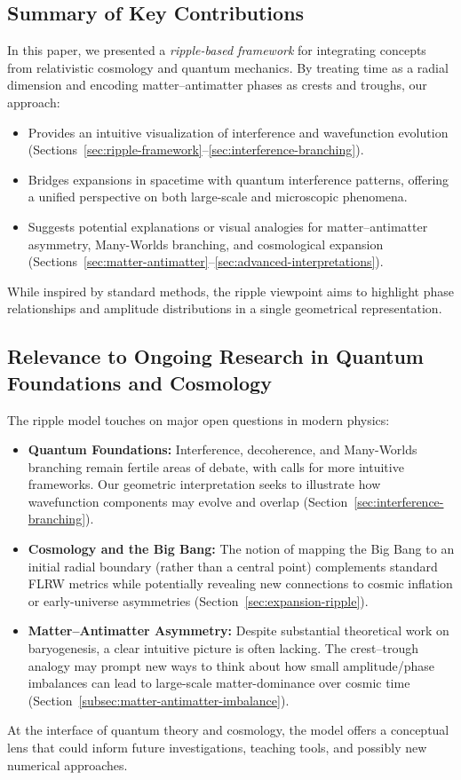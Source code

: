 \documentclass[11pt]{article}
\begin{document}
\subsection{Summary of Key Contributions}
\label{subsec:summary-contributions}
In this paper, we presented a \emph{ripple-based framework} for integrating 
concepts from relativistic cosmology and quantum mechanics. By treating 
time as a radial dimension and encoding matter--antimatter phases as 
crests and troughs, our approach:
\begin{itemize}
  \item Provides an intuitive visualization of interference and wavefunction 
        evolution (Sections~\ref{sec:ripple-framework}--\ref{sec:interference-branching}).
  \item Bridges expansions in spacetime with quantum interference patterns, 
        offering a unified perspective on both large-scale and microscopic phenomena.
  \item Suggests potential explanations or visual analogies for matter--antimatter 
        asymmetry, Many-Worlds branching, and cosmological expansion 
        (Sections~\ref{sec:matter-antimatter}--\ref{sec:advanced-interpretations}).
\end{itemize}
While inspired by standard methods, the ripple viewpoint aims to highlight 
phase relationships and amplitude distributions in a single geometrical 
representation.

\subsection{Relevance to Ongoing Research in Quantum Foundations and Cosmology}
\label{subsec:relevance-research}
The ripple model touches on major open questions in modern physics:
\begin{itemize}
  \item \textbf{Quantum Foundations:} Interference, decoherence, and 
        Many-Worlds branching remain fertile areas of debate, with 
        calls for more intuitive frameworks. Our geometric interpretation 
        seeks to illustrate how wavefunction components may evolve 
        and overlap (Section~\ref{sec:interference-branching}).
  \item \textbf{Cosmology and the Big Bang:} The notion of mapping 
        the Big Bang to an initial radial boundary (rather than a central 
        point) complements standard FLRW metrics while potentially 
        revealing new connections to cosmic inflation or early-universe 
        asymmetries (Section~\ref{sec:expansion-ripple}).
  \item \textbf{Matter--Antimatter Asymmetry:} Despite substantial 
        theoretical work on baryogenesis, a clear intuitive picture 
        is often lacking. The crest--trough analogy may prompt new 
        ways to think about how small amplitude/phase imbalances 
        can lead to large-scale matter-dominance over cosmic time 
        (Section~\ref{subsec:matter-antimatter-imbalance}).
\end{itemize}
At the interface of quantum theory and cosmology, the model offers a 
conceptual lens that could inform future investigations, teaching tools, 
and possibly new numerical approaches.
\end{document}
